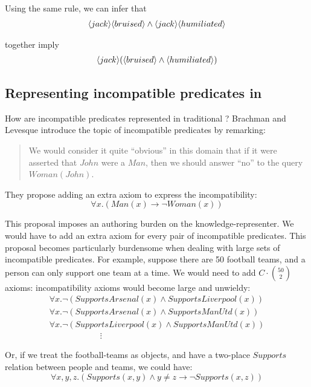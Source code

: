 \NI Using the same rule, we can infer that
\begin{eqnarray*}
   \langle jack \rangle \langle bruised \rangle \land \langle jack \rangle \langle humiliated \rangle \end{eqnarray*}

\NI together imply
\begin{eqnarray*}
\langle jack \rangle (\langle bruised \rangle \land \langle humiliated \rangle )
\end{eqnarray*}
 
\subsection{Representing incompatible predicates in \FOL}\label{incompatiblepredicatesinfol}

\NI How are incompatible predicates represented in traditional
\fol?  Brachman and Levesque\cite{brachman} introduce the
topic of incompatible predicates by remarking:
\begin{quote}
   We would consider it quite ``obvious'' in this domain that if it
   were asserted that $John$ were a $Man$, then we should answer
   ``no'' to the query $Woman(John)$.
\end{quote}

\NI They propose adding an extra axiom to express the incompatibility:
\[
   \forall x. ( Man(x) \rightarrow \neg Woman(x) )
\]  
 
\NI This proposal imposes an authoring burden on the
knowledge-representer.  We would have to add an extra axiom for every
pair of incompatible predicates.  This proposal becomes particularly
burdensome when dealing with large sets of incompatible predicates.
For example, suppose there are 50 football teams, and a person can
only support one team at a time.  We would need to add $C \cdot {50 \choose 2}$
axioms: incompatibility axioms would become large and unwieldy:
\[
\begin{array}{l}
  \forall x.  \neg (SupportsArsenal(x) \land SupportsLiverpool(x))  \\
  \forall x.  \neg (SupportsArsenal(x) \land SupportsManUtd(x))  \\
  \forall x.  \neg (SupportsLiverpool(x) \land SupportsManUtd(x))  \\
  \qquad \qquad \qquad \vdots
\end{array}
\]

\NI Or, if we treat the football-teams as objects, and have a
two-place $Supports$ relation between people and teams, we could have:
\[
   \forall x, y, z. (Supports(x,y) \land y \neq z \rightarrow \neg Supports(x,z))
\]   

